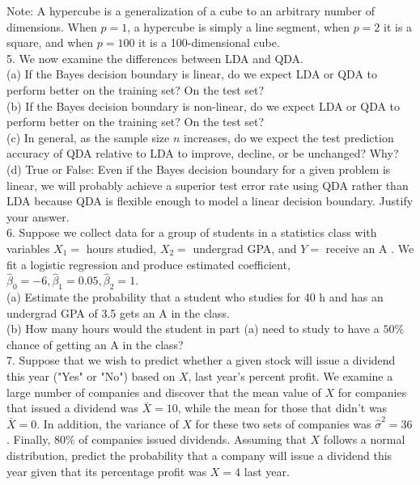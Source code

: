\documentclass[10pt]{article}
\begin{document}
Note: A hypercube is a generalization of a cube to an arbitrary number of dimensions. When $p=1$, a hypercube is simply a line segment, when $p=2$ it is a square, and when $p=100$ it is a 100-dimensional cube.\\
5. We now examine the differences between LDA and QDA.\\
(a) If the Bayes decision boundary is linear, do we expect LDA or QDA to perform better on the training set? On the test set?\\
(b) If the Bayes decision boundary is non-linear, do we expect LDA or QDA to perform better on the training set? On the test set?\\
(c) In general, as the sample size $n$ increases, do we expect the test prediction accuracy of QDA relative to LDA to improve, decline, or be unchanged? Why?\\
(d) True or False: Even if the Bayes decision boundary for a given problem is linear, we will probably achieve a superior test error rate using QDA rather than LDA because QDA is flexible enough to model a linear decision boundary. Justify your answer.\\
6. Suppose we collect data for a group of students in a statistics class with variables $X_{1}=$ hours studied, $X_{2}=$ undergrad GPA, and $Y=$ receive an A . We fit a logistic regression and produce estimated coefficient, $\hat{\beta}_{0}=-6, \hat{\beta}_{1}=0.05, \hat{\beta}_{2}=1$.\\
(a) Estimate the probability that a student who studies for 40 h and has an undergrad GPA of 3.5 gets an A in the class.\\
(b) How many hours would the student in part (a) need to study to have a $50 \%$ chance of getting an A in the class?\\
7. Suppose that we wish to predict whether a given stock will issue a dividend this year ("Yes" or "No") based on $X$, last year's percent profit. We examine a large number of companies and discover that the mean value of $X$ for companies that issued a dividend was $\bar{X}=10$, while the mean for those that didn't was $\bar{X}=0$. In addition, the variance of $X$ for these two sets of companies was $\hat{\sigma}^{2}=36$. Finally, $80 \%$ of companies issued dividends. Assuming that $X$ follows a normal distribution, predict the probability that a company will issue a dividend this year given that its percentage profit was $X=4$ last year.
\end{document}
